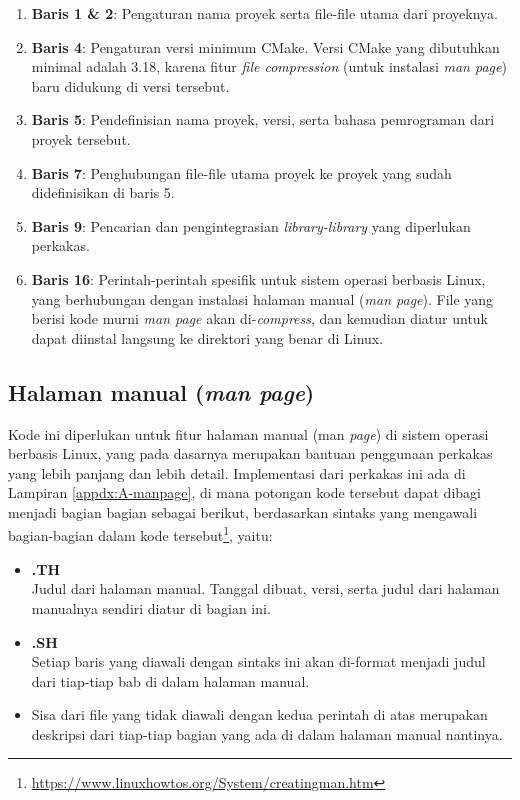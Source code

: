 \begin{enumerate}
	\item \textbf{Baris 1 \& 2}: Pengaturan nama proyek serta file-file utama dari proyeknya.
	\item \textbf{Baris 4}: Pengaturan versi minimum CMake. Versi CMake yang dibutuhkan minimal adalah 3.18, karena fitur \textit{file compression} (untuk instalasi \textit{man page}) baru didukung di versi tersebut.
	\item \textbf{Baris 5}: Pendefinisian nama proyek, versi, serta bahasa pemrograman dari proyek tersebut.
	\item \textbf{Baris 7}: Penghubungan file-file utama proyek ke proyek yang sudah didefinisikan di baris 5.
	\item \textbf{Baris 9}: Pencarian dan pengintegrasian \textit{library-library} yang diperlukan perkakas.
	\item \textbf{Baris 16}: Perintah-perintah spesifik untuk sistem operasi berbasis Linux, yang berhubungan dengan instalasi halaman manual (\textit{man page}). File yang berisi kode murni \textit{man page} akan di-\textit{compress}, dan kemudian diatur untuk dapat diinstal langsung ke direktori yang benar di Linux.
\end{enumerate}
\vspace*{-0.5em} %
\subsection{Halaman manual (\textit{man page})}
\label{sec:testing-implementation-man}

Kode ini diperlukan untuk fitur halaman manual (man \textit{page}) di sistem operasi berbasis Linux, yang pada dasarnya merupakan bantuan penggunaan perkakas yang lebih panjang dan lebih detail. Implementasi dari perkakas ini ada di Lampiran \ref{appdx:A-manpage}, di mana potongan kode tersebut dapat dibagi menjadi bagian bagian sebagai berikut, berdasarkan sintaks yang mengawali bagian-bagian dalam kode tersebut\footnote{\href{https://www.linuxhowtos.org/System/creatingman.htm}{https://www.linuxhowtos.org/System/creatingman.htm}}, yaitu:

\begin{itemize}
	\item \textbf{.TH} \\
	Judul dari halaman manual. Tanggal dibuat, versi, serta judul dari halaman manualnya sendiri diatur di bagian ini.
	\item \textbf{.SH} \\
	Setiap baris yang diawali dengan sintaks ini akan di-format menjadi judul dari tiap-tiap bab di dalam halaman manual.
	\item Sisa dari file yang tidak diawali dengan kedua perintah di atas merupakan deskripsi dari tiap-tiap bagian yang ada di dalam halaman manual nantinya.
\end{itemize}

